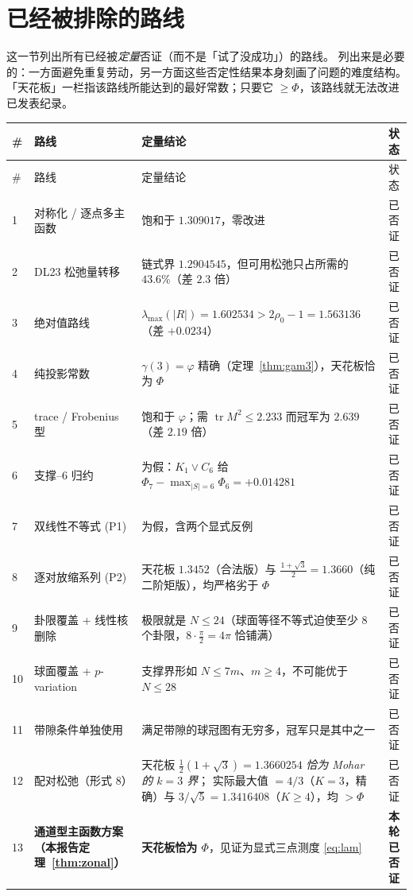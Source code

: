 \documentclass[UTF8,11pt]{ctexart}
\theoremstyle{definition}
\newcommand{\tr}{\operatorname{tr}}
\begin{document}
\section{已经被排除的路线}\label{sec:dead}

这一节列出所有已经被\emph{定量}否证（而不是「试了没成功」）的路线。
列出来是必要的：一方面避免重复劳动，另一方面这些否定性结果本身刻画了问题的难度结构。
「天花板」一栏指该路线所能达到的最好常数；只要它 $\ge\Phi$，该路线就无法改进已发表纪录。

{\small
\begin{longtable}{@{}p{0.5cm}p{5.2cm}p{5.6cm}p{2.6cm}@{}}
\toprule
\# & 路线 & 定量结论 & 状态 \\
\midrule
\endfirsthead
\toprule
\# & 路线 & 定量结论 & 状态 \\
\midrule
\endhead
1 & 对称化 / 逐点多主函数 & 饱和于 $1.309017$，零改进 & 已否证 \\
2 & DL23 松弛量转移 & 链式界 $1.2904545$，但可用松弛只占所需的 $43.6\%$（差 $2.3$ 倍） & 已否证 \\
3 & 绝对值路线 & $\lambda_{\max}(|R|)=1.602534>2\rho_0-1=1.563136$（差 $+0.0234$） & 已否证 \\
4 & 纯投影常数 & $\gamma(3)=\varphi$ 精确（定理~\ref{thm:gam3}），天花板恰为 $\Phi$ & 已否证 \\
5 & trace / Frobenius 型 & 饱和于 $\varphi$；需 $\tr M^2\le2.233$ 而冠军为 $2.639$（差 $2.19$ 倍） & 已否证 \\
6 & 支撑--$6$ 归约 & 为假：$K_1\vee C_6$ 给 $\Phi_7-\max_{|S|=6}\Phi_6=+0.014281$ & 已否证 \\
7 & 双线性不等式 (P1) & 为假，含两个显式反例 & 已否证 \\
8 & 逐对放缩系列 (P2) & 天花板 $1.3452$（合法版）与 $\frac{1+\sqrt3}2=1.3660$（纯二阶矩版），均严格劣于 $\Phi$ & 已否证 \\
9 & 卦限覆盖 + 线性核删除 & 极限就是 $N\le24$（球面等径不等式迫使至少 $8$ 个卦限，$8\cdot\frac\pi2=4\pi$ 恰铺满） & 已否证 \\
10 & 球面覆盖 + $p$-variation & 支撑界形如 $N\le7m$、$m\ge4$，不可能优于 $N\le28$ & 已否证 \\
11 & 带隙条件单独使用 & 满足带隙的球冠图有无穷多，冠军只是其中之一 & 已否证 \\
12 & 配对松弛（形式 8） & 天花板 $\frac12(1+\sqrt3)=1.3660254$ \emph{恰为 Mohar 的 $k=3$ 界}；
实际最大值 $=4/3$（$K=3$，精确）与 $3/\sqrt5=1.3416408$（$K\ge4$），均 $>\Phi$ & 已否证 \\
13 & \textbf{通道型主函数方案（本报告定理~\ref{thm:zonal}）} &
\textbf{天花板恰为 $\Phi$}，见证为显式三点测度 \eqref{eq:lam} &
\textbf{本轮已否证} \\
\bottomrule
\end{longtable}}
\end{document}

